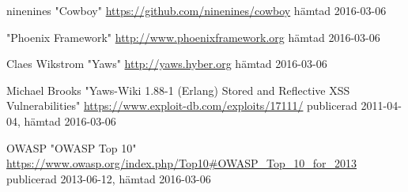 \documentclass[12pt]{article}
\begin{document}
\begin{thebibliography}{99}
ninenines "Cowboy" \url{https://github.com/ninenines/cowboy}
hämtad 2016-03-06



  "Phoenix Framework" \url{http://www.phoenixframework.org}
hämtad 2016-03-06

 Claes Wikstrom "Yaws" \url{http://yaws.hyber.org}
hämtad 2016-03-06

 Michael Brooks "Yaws-Wiki 1.88-1 (Erlang) Stored and Reflective XSS Vulnerabilities"  \url{https://www.exploit-db.com/exploits/17111/}
publicerad 2011-04-04,
hämtad 2016-03-06

 OWASP "OWASP Top 10" \url{https://www.owasp.org/index.php/Top10#OWASP_Top_10_for_2013}
publicerad 2013-06-12,
hämtad 2016-03-06

\end{thebibliography}
\end{document}
